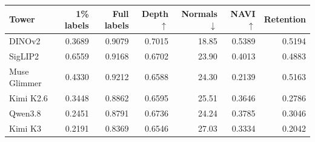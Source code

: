\begin{tabular}{lrrrrrr}
\toprule
Tower & 1\% labels & Full labels & Depth $\uparrow$ & Normals $\downarrow$ & NAVI $\uparrow$ & Retention\\
\midrule
DINOv2 & 0.3689 & 0.9079 & 0.7015 & 18.85 & 0.5389 & 0.5194\\
SigLIP2 & 0.6559 & 0.9168 & 0.6702 & 23.90 & 0.4013 & 0.4883\\
Muse Glimmer & 0.4330 & 0.9212 & 0.6588 & 24.30 & 0.2139 & 0.5163\\
Kimi K2.6 & 0.3448 & 0.8862 & 0.6595 & 25.51 & 0.3646 & 0.2786\\
Qwen3.8 & 0.2451 & 0.8791 & 0.6736 & 24.24 & 0.3785 & 0.3046\\
Kimi K3 & 0.2191 & 0.8369 & 0.6546 & 27.03 & 0.3334 & 0.2042\\
\bottomrule
\end{tabular}
